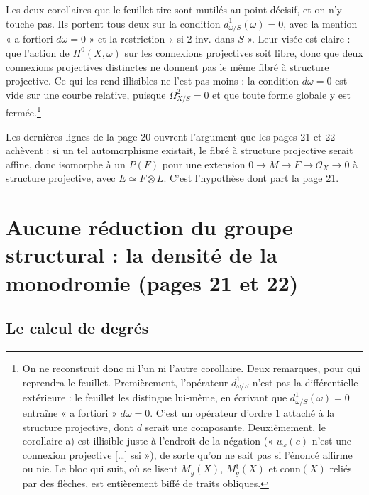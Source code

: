 \documentclass[11pt,a4paper]{article}
\begin{document}
Les deux corollaires que le feuillet tire sont mutilés au point décisif, et on
n'y touche pas. Ils portent tous deux sur la condition
$d^1_{\omega/S}(\omega) = 0$, avec la mention « a fortiori $d\omega = 0$ » et
la restriction « si $2$ inv. dans $S$ ». Leur visée est claire :
que l'action de $H^0(X,\omega)$ sur les connexions projectives soit libre,
donc que deux connexions projectives distinctes ne donnent pas le même fibré à
structure projective. Ce qui les rend illisibles ne l'est pas moins : la
condition $d\omega = 0$ est vide sur une courbe relative, puisque
$\Omega^2_{X/S} = 0$ et que toute forme globale y est fermée.\footnote{On ne
reconstruit donc ni l'un ni l'autre corollaire. Deux remarques, pour qui
reprendra le feuillet. Premièrement, l'opérateur $d^1_{\omega/S}$ n'est pas la
différentielle extérieure : le feuillet les distingue lui-même, en écrivant
que $d^1_{\omega/S}(\omega) = 0$ entraîne « a fortiori » $d\omega = 0$. C'est
un opérateur d'ordre $1$ attaché à la structure projective, dont $d$ serait
une composante. Deuxièmement, le corollaire a) est illisible juste à
l'endroit de la négation (« $u_\omega(c)$ n'est une connexion projective
[\ldots] ssi »), de sorte qu'on ne sait pas si l'énoncé affirme ou nie. Le
bloc qui suit, où se lisent $M_g(X)$, $M_g^{\mathfrak{z}}(X)$ et
$\mathrm{conn}(X)$ reliés par des flèches, est entièrement biffé de traits
obliques.}

Les dernières lignes de la page 20 ouvrent l'argument que les pages 21 et 22
achèvent : si un tel automorphisme existait, le fibré à structure projective
serait affine, donc isomorphe à un $P(F)$ pour une extension
$0 \to M \to F \to \mathcal{O}_X \to 0$ à structure projective, avec
$E \simeq F \otimes L$. C'est l'hypothèse dont part la page 21.

\section*{Aucune réduction du groupe structural : la densité de la monodromie (pages 21 et 22)}

\subsection*{Le calcul de degrés}
\end{document}

